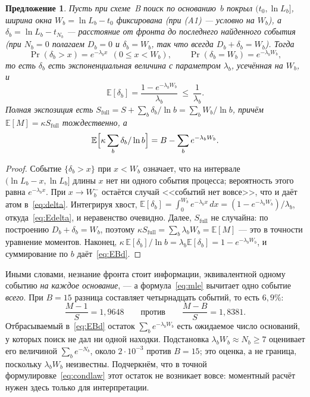 \documentclass[11pt,a4paper]{article}
\theoremstyle{plain}
\newtheorem{proposition}{Предложение}
\theoremstyle{remark}
\begin{document}
\begin{proposition}\label{prop:delta}
Пусть при схеме~B поиск по основанию~$b$ покрыл $(t_0,\ln L_b]$, ширина окна
$W_b=\ln L_b-t_0$ фиксирована (при (A1) --- условно на $W_b$), а
$\delta_b=\ln L_b-t_{N_b}$ --- расстояние от фронта до последнего
найденного события (при $N_b=0$ полагаем $D_b=0$ и $\delta_b=W_b$, так что
всегда $D_b+\delta_b=W_b$). Тогда
\begin{equation}\label{eq:delta}
\Pr(\delta_b>x)=e^{-\lambda_b x}\ \ (0\le x<W_b),\qquad
\Pr(\delta_b=W_b)=e^{-\lambda_b W_b},
\end{equation}
то есть $\delta_b$ есть экспоненциальная величина с параметром $\lambda_b$,
усечённая на $W_b$, и
\begin{equation}\label{eq:Edelta}
\mathbb E[\delta_b]=\frac{1-e^{-\lambda_b W_b}}{\lambda_b}\ \le\ \frac{1}{\lambda_b}.
\end{equation}
Полная экспозиция есть $S_{\mathrm{full}}=S+\sum_b\delta_b/\ln b=\sum_b W_b/\ln b$,
причём $\mathbb E[M]=\kappa S_{\mathrm{full}}$ тождественно, а
\begin{equation}\label{eq:EBd}
\mathbb E\Bigl[\kappa\sum_b\delta_b/\ln b\Bigr]=B-\sum_b e^{-\lambda_b W_b}.
\end{equation}
\end{proposition}

\begin{proof}
Событие $\{\delta_b>x\}$ при $x<W_b$ означает, что на интервале
$(\ln L_b-x,\ln L_b]$ длины $x$ нет ни одного события процесса; вероятность этого
равна $e^{-\lambda_b x}$. При $x\to W_b^-$ остаётся случай <<событий нет вовсе>>,
что и даёт атом в~\eqref{eq:delta}. Интегрируя хвост,
$\mathbb E[\delta_b]=\int_0^{W_b}e^{-\lambda_b x}\,dx=(1-e^{-\lambda_b W_b})/\lambda_b$,
откуда~\eqref{eq:Edelta}, и неравенство очевидно. Далее, $S_{\mathrm{full}}$ не
случайна: по построению $D_b+\delta_b=W_b$, поэтому
$\kappa S_{\mathrm{full}}=\sum_b\lambda_b W_b=\mathbb E[M]$ --- это в точности
уравнение моментов. Наконец,
$\kappa\,\mathbb E[\delta_b]/\ln b=\lambda_b\mathbb E[\delta_b]=1-e^{-\lambda_b W_b}$,
и суммирование по $b$ даёт~\eqref{eq:EBd}.
\end{proof}

Иными словами, незнание фронта стоит информации, эквивалентной одному событию
\emph{на каждое основание}, --- а формула~\eqref{eq:mle} вычитает одно событие
\emph{всего}. При $B=15$ разница составляет четырнадцать событий, то есть $6{,}9\%$:
\begin{equation}\label{eq:cost}
\frac{M-1}{S}=1{,}9648\qquad\text{против}\qquad\frac{M-B}{S}=1{,}8381 .
\end{equation}
Отбрасываемый в~\eqref{eq:EBd} остаток $\sum_b e^{-\lambda_b W_b}$ есть ожидаемое
число оснований, у которых поиск не дал ни одной находки. Подстановка
$\lambda_bW_b\approx N_b\ge7$ оценивает его величиной $\sum_be^{-N_b}$, около
$2\cdot10^{-3}$ против $B=15$; это оценка, а не граница, поскольку $\lambda_bW_b$
неизвестны. Подчеркнём, что в точной формулировке~\eqref{eq:condlaw} этот остаток не
возникает вовсе: моментный расчёт нужен здесь только для интерпретации.
\end{document}
